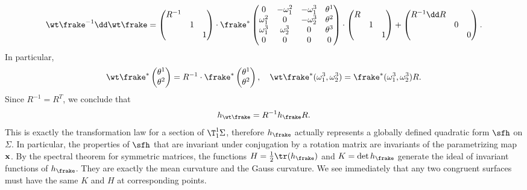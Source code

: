 \[\wt\frake^{-1}\dd\wt\frake=
\begin{pmatrix}
    R^{-1} &&\\
    &1 &\\
    &&1
\end{pmatrix}\cdot
\frake^\ast 
\begin{pmatrix}
    0 & -\omega_1^2 & -\omega_1^3& \theta^1\\
    \omega_1^2 & 0 & -\omega_2^3 & \theta^2\\
    \omega_1^3 & \omega_2^3 & 0 & \theta^3\\
    0 & 0& 0& 0
\end{pmatrix}\cdot
\begin{pmatrix}
    R &&\\
    &1 &\\
    &&1
\end{pmatrix}+
\begin{pmatrix}
    R^{-1}\dd R &&\\
    &0 &\\
    &&0
\end{pmatrix}.
\]
In particular, 
\[\wt\frake^\ast \begin{pmatrix}
    \theta^1 \\ \theta^2
\end{pmatrix}=R^{-1}\cdot \frake^\ast \begin{pmatrix}
    \theta^1 \\ \theta^2
\end{pmatrix},
\quad 
\wt\frake^\ast(\omega_1^3,\omega_2^3)=\frake^\ast(\omega_1^3,\omega_2^3)R.
\]
Since $R^{-1}=R^T$, we conclude that 
\[h_{\wt\frake}=R^{-1}h_\frake R.\]
This is exactly the transformation law for a section of $\T^1_1 \Sigma$, therefore $h_{\frake}$ actually represents a globally defined quadratic form $\sfh$ on $\Sigma$. In particular, the properties of $\sfh$ that are invariant under conjugation by a rotation matrix are invariants of the parametrizing map $\bf{x}$. By the spectral theorem for symmetric matrices, the functions $H=\frac12 \tr(h_\frake)$ and $K=\det h_\frake$ generate the ideal of invariant functions of $h_\frake$. They are exactly the mean curvature and the Gauss curvature. We see immediately that any two congruent surfaces must have the same $K$ and $H$ at corresponding points.


